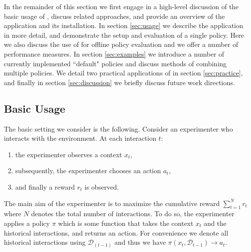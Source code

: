 \documentclass[nojss]{jss}
\begin{document}
In the remainder of this section we first engage in a high-level discussion of the basic usage of , discuss related approaches, and provide an overview of the application and its installation. In section \ref{sec:usage} we describe the application in more detail, and demonstrate the setup and evaluation of a single policy. Here we also discuss the use of  for offline policy evaluation and we offer a number of performance measures. In section \ref{sec:examples} we introduce a number of currently implemented ``default" policies and discuss methods of combining multiple policies. We detail two practical applications of  in section \ref{sec:practice}, and finally in section \ref{sec:discussion} we briefly discuss future work directions. 

\subsection{Basic Usage}

The basic setting we consider is the following. Consider an experimenter who interacts with the environment. At each interaction $t$:
\begin{enumerate}
\item the experimenter observes a context $x_t$,
\item subsequently, the experimenter chooses an action $a_t$,
\item and finally a reward $r_t$ is observed.
\end{enumerate}
The main aim of the experimenter is to maximize the cumulative reward $\sum_{t=1}^N r_t$ where $N$ denotes the total number of interactions. To do so, the experimenter applies a policy $\pi$ which is some function that takes the context $x_t$ and the historical interactions, and returns an action. For convenience we denote all historical interactions using $\mathcal{D}_{(t-1)}$ and thus we have $\pi(x_t, \mathcal{D}_{t-1}) \rightarrow a_t$. 
\end{document}
